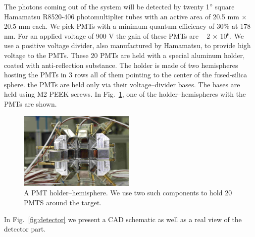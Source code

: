 The photons coming out of the system will be detected by twenty 1'' square Hamamatsu R8520-406 photomultiplier 
tubes with an active area of 20.5 mm $\times$ 20.5 mm each. We pick PMTs with a minimum quantum efficiency of 30\% 
at 178 nm. For an applied voltage of 900 V the gain of these PMTs are ~ 2 $\times$ 10$^6$. We use a positive 
voltage divider, also manufactured by Hamamatsu, to provide high voltage to the PMTs.
These 20 PMTs are held with a special aluminum holder, coated with anti-reflection substance. The holder is made of two hemispheres hosting the PMTs in 
3 rows all of them pointing to the center of the fused-silica sphere. the PMTs are held only via their voltage--divider bases. 
The bases are held using M2 PEEK screws. 
In Fig.~\ref{fig:pmtholder}, one of the holder--hemispheres with the PMTs are shown.

\begin{figure}
   \centering
   \includegraphics[width=0.5\textwidth]{PMTholder.JPG}
   \caption{A PMT holder--hemisphere. We use two such components to hold 20 PMTS around the target.} 
   \label{fig:pmtholder}
\end{figure}


In Fig.~\ref{fig:detector} we present a CAD schematic as well as a real view of the detector part.

